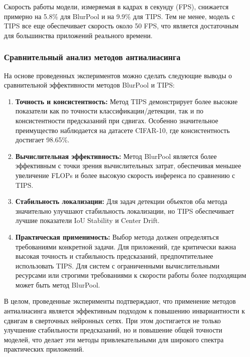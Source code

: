 Скорость работы модели, измеряемая в кадрах в секунду (FPS), снижается примерно на 5.8\% для BlurPool и на 9.9\% для TIPS. Тем не менее, модель с TIPS все еще обеспечивает скорость около 50 FPS, что является достаточным для большинства приложений реального времени.

\subsubsection{Сравнительный анализ методов антиалиасинга}

На основе проведенных экспериментов можно сделать следующие выводы о сравнительной эффективности методов BlurPool и TIPS:

\begin{enumerate}
    \item \textbf{Точность и консистентность:} Метод TIPS демонстрирует более высокие показатели как по точности классификации/детекции, так и по консистентности предсказаний при сдвигах. Особенно значительное преимущество наблюдается на датасете CIFAR-10, где консистентность достигает 98.65\%.
    
    \item \textbf{Вычислительная эффективность:} Метод BlurPool является более эффективным с точки зрения вычислительных затрат, обеспечивая меньшее увеличение FLOPs и более высокую скорость инференса по сравнению с TIPS.
    
    \item \textbf{Стабильность локализации:} Для задач детекции объектов оба метода значительно улучшают стабильность локализации, но TIPS обеспечивает лучшие показатели IoU Stability и Center Drift.
    
    \item \textbf{Практическая применимость:} Выбор метода должен определяться требованиями конкретной задачи. Для приложений, где критически важна высокая точность и стабильность предсказаний, предпочтительнее использовать TIPS. Для систем с ограниченными вычислительными ресурсами или строгими требованиями к скорости работы более подходящим может быть метод BlurPool.
\end{enumerate}

В целом, проведенные эксперименты подтверждают, что применение методов антиалиасинга является эффективным подходом к повышению инвариантности к сдвигам в сверточных нейронных сетях. При этом достигается не только улучшение стабильности предсказаний, но и повышение общей точности моделей, что делает эти методы привлекательными для широкого спектра практических приложений.

\newpage
